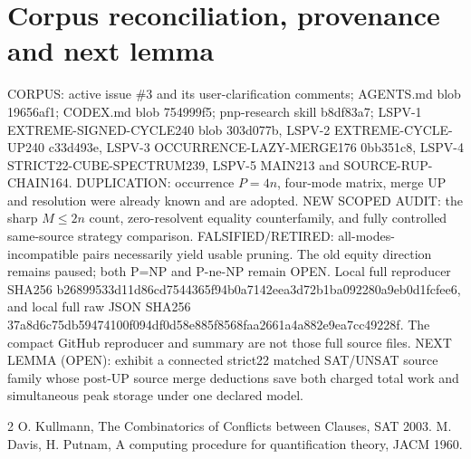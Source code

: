 \documentclass{article}
\begin{document}
\section{Corpus reconciliation, provenance and next lemma}
CORPUS: active issue \#3 and its user-clarification comments; AGENTS.md blob 19656af1; CODEX.md blob 754999f5; pnp-research skill b8df83a7; LSPV-1 EXTREME-SIGNED-CYCLE240 blob 303d077b, LSPV-2 EXTREME-CYCLE-UP240 c33d493e, LSPV-3 OCCURRENCE-LAZY-MERGE176 0bb351c8, LSPV-4 STRICT22-CUBE-SPECTRUM239, LSPV-5 MAIN213 and SOURCE-RUP-CHAIN164. DUPLICATION: occurrence $P=4n$, four-mode matrix, merge UP and resolution were already known and are adopted. NEW SCOPED AUDIT: the sharp $M\le2n$ count, zero-resolvent equality counterfamily, and fully controlled same-source strategy comparison. FALSIFIED/RETIRED: all-modes-incompatible pairs necessarily yield usable pruning. The old equity direction remains paused; both P=NP and P-ne-NP remain OPEN.
Local full reproducer SHA256 b26899533d11d86cd7544365f94b0a7142eea3d72b1ba092280a9eb0d1fcfee6, and local full raw JSON SHA256 37a8d6c75db59474100f094df0d58e885f8568faa2661a4a882e9ea7cc49228f. The compact GitHub reproducer and summary are not those full source files.
NEXT LEMMA (OPEN): exhibit a connected strict22 matched SAT/UNSAT source family whose post-UP source merge deductions save both charged total work and simultaneous peak storage under one declared model.
\begin{thebibliography}{2}
 O. Kullmann, The Combinatorics of Conflicts between Clauses, SAT 2003.
 M. Davis, H. Putnam, A computing procedure for quantification theory, JACM 1960.
\end{thebibliography}
\end{document}
